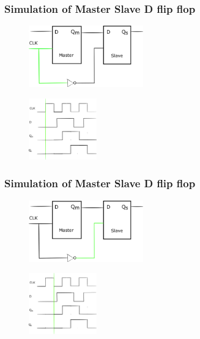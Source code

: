 \documentclass{beamer}
\begin{document}
\begin{frame}
\frametitle{Simulation of Master Slave D flip flop}
\begin{figure}[h]
    \includegraphics[width=.7\textwidth,height=100px]{name/path3.png}
\end{figure}
\begin{figure}[h]
    \includegraphics[width=.7\textwidth,height=100px]{name/clk1.png}
\end{figure}
\end{frame}

\begin{frame}
\frametitle{Simulation of Master Slave D flip flop}
\begin{figure}[h]
    \includegraphics[width=.7\textwidth,height=100px]{name/path2.png}
\end{figure}
\begin{figure}[h]
    \includegraphics[width=.7\textwidth,height=100px]{name/clk2.png}
\end{figure}
\end{frame}
\end{document}
